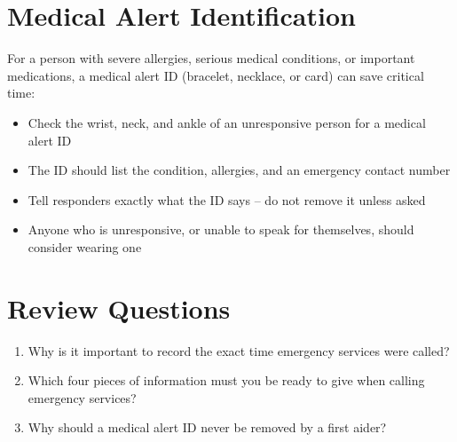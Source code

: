 \section{Medical Alert Identification}

For a person with severe allergies, serious medical conditions, or important medications, a medical alert ID (bracelet, necklace, or card) can save critical time:

\begin{itemize}[leftmargin=*]
  \item Check the wrist, neck, and ankle of an unresponsive person for a medical alert ID
  \item The ID should list the condition, allergies, and an emergency contact number
  \item Tell responders exactly what the ID says -- do not remove it unless asked
  \item Anyone who is unresponsive, or unable to speak for themselves, should consider wearing one
\end{itemize}

\section{Review Questions}

\begin{enumerate}[leftmargin=*]
\item Why is it important to record the exact time emergency services were called?
\item Which four pieces of information must you be ready to give when calling emergency services?
\item Why should a medical alert ID never be removed by a first aider?
\end{enumerate}
